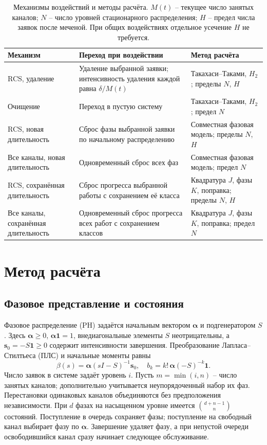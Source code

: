 \begin{table}[!htbp]
\centering\small
\begin{tabular}{@{}p{3.6cm}p{6.0cm}p{5.0cm}@{}}
\toprule
Механизм & Переход при воздействии & Метод расчёта \\
\midrule
RCS, удаление & Удаление выбранной заявки; интенсивность удаления каждой равна \(\delta/M(t)\) & Такахаси--Таками, \(H_2\); пределы \(N\), \(H\) \\
Очищение & Переход в пустую систему & Такахаси--Таками, \(H_2\); предел \(N\) \\
RCS, новая длительность & Сброс фазы выбранной заявки по начальному распределению & Совместная фазовая модель; пределы \(N\), \(H\) \\
Все каналы, новая длительность & Одновременный сброс всех фаз & Совместная фазовая модель; предел \(N\) \\
RCS, сохранённая длительность & Сброс прогресса выбранной работы с сохранением её класса & Квадратура \(J\), фазы \(K\), поправка; пределы \(N\), \(H\) \\
Все каналы, сохранённая длительность & Одновременный сброс прогресса всех работ с сохранением классов & Квадратура \(J\), фазы \(K\), поправка; предел \(N\) \\
\bottomrule
\end{tabular}
\caption{Механизмы воздействий и методы расчёта. \(M(t)\) -- текущее число занятых каналов; \(N\) -- число уровней стационарного распределения; \(H\) -- предел числа заявок после меченой. При общих воздействиях отдельное усечение \(H\) не требуется.}
\label{tab:methods}
\end{table}

\section{Метод расчёта}
\subsection{Фазовое представление и состояния}
Фазовое распределение (PH) задаётся начальным вектором \(\boldsymbol\alpha\) и подгенератором \(S\). Здесь \(\boldsymbol\alpha\ge0\), \(\boldsymbol\alpha\mathbf1=1\), внедиагональные элементы \(S\) неотрицательны, а \(\boldsymbol s_0=-S\mathbf1\ge0\) содержит интенсивности завершения. Преобразование Лапласа--Стилтьеса (ПЛС) и начальные моменты равны
\[
\beta(s)=\boldsymbol\alpha(sI-S)^{-1}\boldsymbol s_0,\quad
b_k=k!\,\boldsymbol\alpha(-S)^{-k}\mathbf1.
\]
Число заявок в системе задаёт уровень \(i\). Пусть \(m=\min(i,n)\) -- число занятых каналов; дополнительно учитывается неупорядоченный набор их фаз. Перестановки одинаковых каналов объединяются без предположения независимости. При \(d\) фазах на насыщенном уровне имеется \(\binom{d+n-1}{n}\) состояний. Поступление в очередь сохраняет фазы; поступление на свободный канал выбирает фазу по \(\boldsymbol\alpha\). Завершение удаляет фазу, а при непустой очереди освободившийся канал сразу начинает следующее обслуживание.

